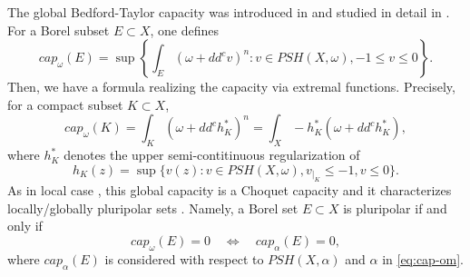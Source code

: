 \documentclass{amsart}
\newcommand{\al}{\alpha}
\newcommand{\om}{\omega}
\newcommand{\tc}{{\tt c}}
\newcommand{\Om}{\Omega}
\newcommand{\cali}[1]{\mathscr{#1}}
\newcommand{\Kc}{\cali{K}}
\newtheorem{lem}[thm]{Lemma}
\theoremstyle{definition}
\numberwithin{thm}{section}
\numberwithin{equation}{section}
\renewcommand{\[}{\begin{equation}}
\renewcommand{\]}{\end{equation}}
\newcommand{\rv}{\;\rvert\;}
\begin{document}

The global Bedford-Taylor capacity was introduced in \cite{Ko03} and studied in detail in \cite{GZ05, GZ-book}.  For a Borel subset $E\subset X$, one defines 
\[\label{eq:cap-om}
	cap_\om (E) = \sup \left\{\int_E (\om + dd^c v)^n : v\in PSH(X, \om), -1\leq v \leq 0 \right\}.
\]
Then,  we have a formula \cite[Theorem~9.15]{GZ-book} realizing the capacity via extremal functions. Precisely, for a compact subset $K\subset X$,
\[\label{eq:cap-id}
	cap_\om (K) = \int_K (\om+ dd^c h_K^*)^n = \int_X - h_K^* (\om+dd^c h_K^*),
\]
where $h_K^*$ denotes the upper semi-contitinuous regularization of 
\[\label{eq:ext-h-formula}
	h_K(z) = \sup\{ v(z): v \in PSH(X,\om), v_{|_K} \leq -1, v \leq 0\}.
\]
As in local case \cite{BT82}, this global capacity is a Choquet capacity and it characterizes locally/globally pluripolar sets \cite[Theorem~9.17]{GZ-book}. Namely, a Borel set $E\subset X$ is pluripolar if and only if
\[\label{eq:pluripolar-cap}	
	cap_\om(E) =0 \quad \Leftrightarrow \quad cap_\al (E) =0,
\]
where $cap_\al(E)$ is considered with respect to  $PSH(X,\al)$ and $\al$   in  \eqref{eq:cap-om}.
\end{document}
